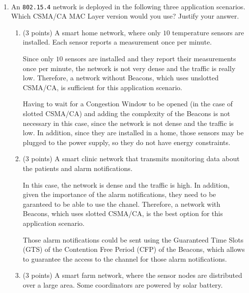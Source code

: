 \documentclass[12pt]{article}
\begin{document}
    \newpage
    \setcounter{ejercicio}{0} %
    \newpage













    \begin{ejercicio}[20 points]
        ~
        \begin{enumerate}[label=\alph*)]
            \item An \verb|802.15.4| network is deployed in the following three application scenarios. Which CSMA/CA MAC Layer version would you use? Justify your answer.
            \begin{enumerate}[label=\roman*)]
                \item (3 points) A smart home network, where only $10$ temperature sensors are installed. Each sensor reports a measurement once per minute.
                
                Since only $10$ sensors are installed and they report their measurements once per minute, the network is not very dense and the traffic is really low. Therefore, a network without Beacons, which uses unslotted CSMA/CA, is sufficient for this application scenario.
                
                Having to wait for a Congestion Window to be opened (in the case of slotted CSMA/CA) and adding the complexity of the Beacons is not necessary in this case, since the network is not dense and the traffic is low. In addition, since they are installed in a home, those sensors may be plugged to the power supply, so they do not have energy constraints.
                
                
                \item (3 points) A smart clinic network that transmits monitoring data about the patients and alarm notifications.
                
                In this case, the network is dense and the traffic is high. In addition, given the importance of the alarm notifications, they need to be garanteed to be able to use the chanel. Therefore, a network with Beacons, which uses slotted CSMA/CA, is the best option for this application scenario.

                Those alarm notifications could be sent using the Guaranteed Time Slots (GTS) of the Contention Free Period (CFP) of the Beacons, which allows to guarantee the access to the channel for those alarm notifications.
                \item (3 points) A smart farm network, where the sensor nodes are distributed over a large area. Some coordinators are powered by solar battery.
                

\end{enumerate}
\end{enumerate}
\end{ejercicio}
\end{document}
